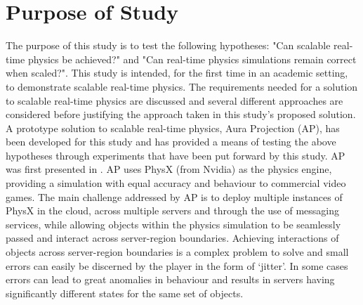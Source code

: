 \section{Purpose of Study}
The purpose of this study is to test the following hypotheses: "Can scalable real-time physics be achieved?" and "Can real-time physics simulations remain correct when scaled?". This study is intended, for the first time in an academic setting, to demonstrate scalable real-time physics. 
The requirements needed for a solution to scalable real-time physics are discussed and several different approaches are considered before justifying the approach taken in this study's proposed solution. 
A prototype solution to scalable real-time physics, Aura Projection (AP), has been developed for this study and has provided a means of testing the above hypotheses through experiments that have been put forward by this study. AP was first presented in \cite{brown2019aura}.
AP uses PhysX \cite{PhysX} (from Nvidia) as the physics engine, providing a simulation with equal accuracy and behaviour to commercial video games. The main challenge addressed by AP is to deploy multiple instances of PhysX in the cloud, across multiple servers and through the use of messaging services, while allowing objects within the physics simulation to be seamlessly passed and interact across server-region boundaries. Achieving interactions of objects across server-region boundaries is a complex problem to solve and small errors can easily be discerned by the player in the form of `jitter'. In some cases errors can lead to great anomalies in behaviour and results in servers having significantly different states for the same set of objects.

